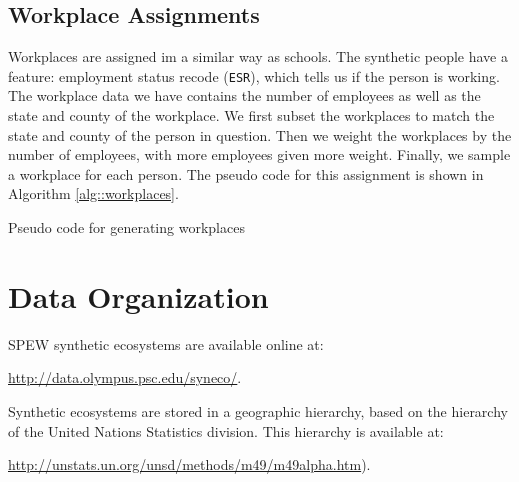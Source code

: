 \documentclass{article}
\begin{document}
	\subsection{Workplace Assignments}

        Workplaces are assigned im a similar way as schools.  The synthetic people have a feature: employment status recode (\texttt{ESR}), which tells us if the person is working.  The workplace data we have contains the number of employees as well as the state and county of the workplace.  We first subset the workplaces to match the state and county of the person in question.  Then we weight the workplaces by the number of employees, with more employees given more weight.  Finally, we sample a workplace for each person.  The pseudo code for this assignment is shown in Algorithm \ref{alg::workplaces}. \\

		\begin{algorithm}[H]
                  \label{alg::workplaces}
			\SetAlgoLined
                \caption{Pseudo code for generating workplaces}
		\end{algorithm}

\newpage
\section{Data Organization}
SPEW synthetic ecosystems are available online at: 

	\vspace{2mm}
	\url{http://data.olympus.psc.edu/syneco/}. 
	\vspace{2mm}

Synthetic ecosystems are stored in a geographic hierarchy, based on the hierarchy of the United Nations Statistics division. This hierarchy is available at: 
	
	\vspace{2mm}
	\url{http://unstats.un.org/unsd/methods/m49/m49alpha.htm}). 
	\vspace{2mm}
\end{document}
